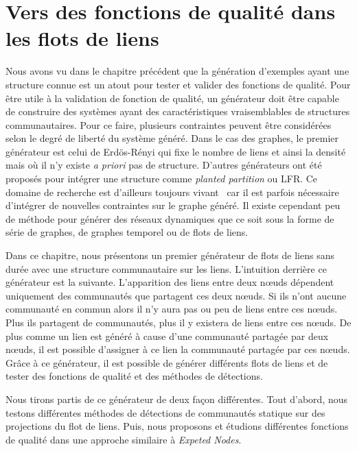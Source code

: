 \chapter{Vers des fonctions de qualité dans les flots de liens}
\minitoc
\label{versQualite}

Nous avons vu dans le chapitre précédent que la génération d'exemples ayant une structure connue est un atout pour tester et valider des fonctions de qualité.
Pour être utile à la validation de fonction de qualité, un générateur doit être capable de construire des systèmes ayant des caractéristiques vraisemblables de structures communautaires.
Pour ce faire, plusieurs contraintes peuvent être considérées selon le degré de liberté du système généré.
Dans le cas des graphes, le premier générateur est celui de Erdös-Rényi qui fixe le nombre de liens et ainsi la densité mais où il n'y existe \emph{a priori} pas de structure.
D'autres générateurs ont été proposés pour intégrer une structure comme \emph{planted partition} ou LFR.
Ce domaine de recherche est d'ailleurs toujours vivant~\cite{Tabourier2011,Obradovic2014} car il est parfois nécessaire d'intégrer de nouvelles contraintes sur le graphe généré.
Il existe cependant peu de méthode pour générer des réseaux dynamiques que ce soit sous la forme de série de graphes, de graphes temporel ou de flots de liens.


Dans ce chapitre, nous présentons un premier générateur de flots de liens sans durée avec une structure communautaire sur les liens.
L'intuition derrière ce générateur est la suivante.
L'apparition des liens entre deux n\oe uds dépendent uniquement des communautés que partagent ces deux n\oe uds.
Si ils n'ont aucune communauté en commun alors il n'y aura pas ou peu de liens entre ces n\oe uds.
Plus ils partagent de communautés, plus il y existera de liens entre ces n\oe uds.
De plus comme un lien est généré à cause d'une communauté partagée par deux n\oe uds, il est possible d'assigner à ce lien la communauté partagée par ces n\oe uds.
Grâce à ce générateur, il est possible de générer différents flots de liens et de tester des fonctions de qualité et des méthodes de détections.

Nous tirons partis de ce générateur de deux façon différentes.
Tout d'abord, nous testons différentes méthodes de détections de communautés statique sur des projections du flot de liens.
Puis, nous proposons et étudions différentes fonctions de qualité dans une approche similaire à \emph{Expeted Nodes}.

\bigskip

